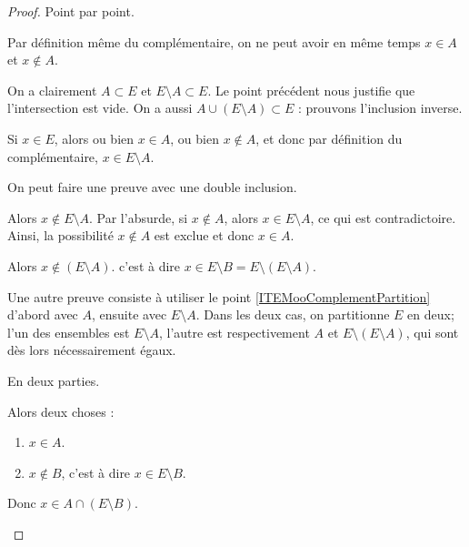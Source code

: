 \begin{proof}
	Point par point.
	\begin{subproof}
  		Par définition même du complémentaire, on ne peut avoir en même temps \( x \in A \) et \(x \notin A \).
 		
		On a clairement \( A \subset E \) et \( E \setminus A \subset E \). Le point précédent nous justifie que l'intersection est vide. On a aussi \( A \cup ( E \setminus A) \subset E \) : prouvons l'inclusion inverse.

  		Si \( x \in E \), alors ou bien \( x \in A \), ou bien \( x \not\in A\), et donc par définition du complémentaire, \( x \in E \setminus A \).
    
		On peut faire une preuve avec une double inclusion.
		\begin{subproof}
   			Alors  \( x\not\in E\setminus A \). Par l'absurde, si \( x\not\in A\), alors \( x \in E \setminus A \), ce qui est contradictoire. Ainsi, la possibilité \( x\not\in A\) est exclue et donc \( x\in A\).

			\spitem[Si \( x\in A\)]
			Alors \( x\not\in (E\setminus A) \).  c'est à dire \( x\in E\setminus B=E\setminus(E\setminus A )\).
		\end{subproof}

  		Une autre preuve consiste à utiliser le point \ref{ITEMooComplementPartition} d'abord avec \( A \), ensuite avec \( E \setminus A\). Dans les deux cas, on partitionne \( E \) en deux; l'un des ensembles est \( E \setminus A \), l'autre est respectivement \( A \) et \( E \setminus (E \setminus A) \), qui sont dès lors nécessairement égaux.

		En deux parties.
		\begin{subproof}
			\spitem[Si \( x\in A\setminus B\)]
			Alors deux choses :
			\begin{enumerate}
				\item
				      \( x\in A\).
				\item
				      \( x\not\in B\), c'est à dire \( x\in E\setminus B\).
			\end{enumerate}
			Donc \( x\in A\cap(E\setminus B)\).


\end{subproof}
\end{subproof}
\end{proof}
